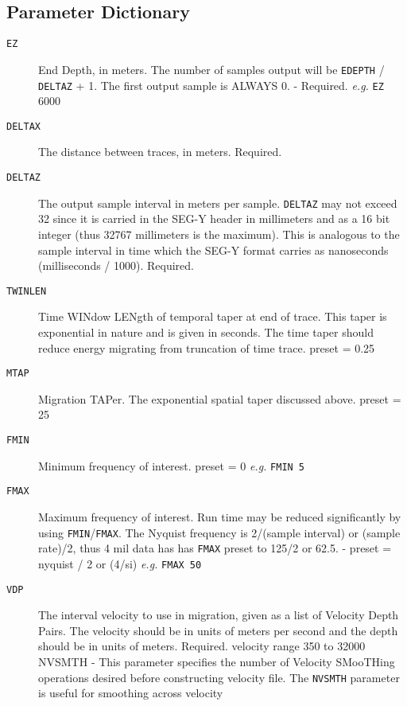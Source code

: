 \subsection{Parameter Dictionary}

\begin{description}
\item[\texttt{EZ}] End Depth, in meters.  The number of samples output will be
         \texttt{EDEPTH}  / \texttt{DELTAZ} + 1.  The first output sample is ALWAYS 0.
       - Required.  \textit{e.g.}  \texttt{EZ} 6000
\item[\texttt{DELTAX}] The distance between traces, in meters.
         Required.
\item[\texttt{DELTAZ}] The output sample interval in meters per sample.  \texttt{DELTAZ} may
         not exceed 32 since it is carried in the SEG-Y header in
         millimeters and as a 16 bit integer (thus 32767 millimeters
         is the maximum).  This is analogous to the sample interval
         in time which the SEG-Y format carries as nanoseconds
         (milliseconds / 1000).
         Required.
\item[\texttt{TWINLEN}] Time WINdow LENgth of temporal taper at end of trace. This
          taper is exponential in nature and is given in seconds. The
          time taper should reduce energy migrating from truncation
          of time trace.
          \Gls{preset} = 0.25
\item[\texttt{MTAP}] Migration TAPer.  The exponential spatial taper discussed above.
         preset = 25
\item[\texttt{FMIN}] Minimum frequency of interest.
         \Gls{preset} = 0     \textit{e.g.} \texttt{FMIN 5}
\item[\texttt{FMAX}] Maximum frequency of interest.  Run time may be reduced
         significantly by using \texttt{FMIN}/\texttt{FMAX}.  The Nyquist frequency is
         2/(sample interval) or (sample rate)/2, thus 4 mil data has
         has \texttt{FMAX} preset to 125/2 or 62.5.
       - preset = nyquist / 2  or   (4/si)    \textit{e.g.} \texttt{FMAX 50}
\item[\texttt{VDP}] The interval velocity to use in migration, given as a list of
         Velocity Depth Pairs.  The velocity should be in units of
         meters per second and the depth should be in units of
         meters.
         Required.    velocity range 350 to 32000
NVSMTH - This parameter specifies the number of Velocity SMooTHing
         operations desired before constructing velocity file.
         The \texttt{NVSMTH} parameter is useful for smoothing across velocity

\end{description}

